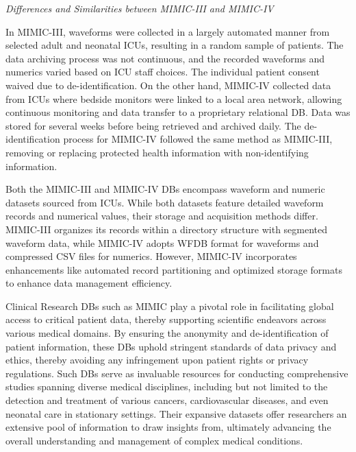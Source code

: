 \vspace{0.2cm}
\textit{Differences and Similarities between MIMIC-III and MIMIC-IV}
\vspace{0.2cm}

In MIMIC-III, waveforms were collected in a largely automated manner from selected adult and neonatal ICUs, resulting in a random sample of patients.
The data archiving process was not continuous, and the recorded waveforms and numerics varied based on ICU staff choices.
The individual patient consent waived due to de-identification.
On the other hand, MIMIC-IV collected data from ICUs where bedside monitors were linked to a local area network, allowing continuous monitoring and data transfer to a proprietary relational DB.
Data was stored for several weeks before being retrieved and archived daily.
The de-identification process for MIMIC-IV followed the same method as MIMIC-III, removing or replacing protected health information with non-identifying information.

Both the MIMIC-III and MIMIC-IV DBs encompass waveform and numeric datasets sourced from ICUs.
While both datasets feature detailed waveform records and numerical values, their storage and acquisition methods differ.
MIMIC-III organizes its records within a directory structure with segmented waveform data, while MIMIC-IV adopts WFDB format for waveforms and compressed CSV files for numerics.
However, MIMIC-IV incorporates enhancements like automated record partitioning and optimized storage formats to enhance data management efficiency.

\vspace{0.2cm}

Clinical Research DBs such as MIMIC play a pivotal role in facilitating global access to critical patient data, thereby supporting scientific endeavors across various medical domains.
By ensuring the anonymity and de-identification of patient information, these DBs uphold stringent standards of data privacy and ethics, thereby avoiding any infringement upon patient rights or privacy regulations.
Such DBs serve as invaluable resources for conducting comprehensive studies spanning diverse medical disciplines, including but not limited to the detection and treatment of various cancers, cardiovascular diseases, and even neonatal care in stationary settings.
Their expansive datasets offer researchers an extensive pool of information to draw insights from, ultimately advancing the overall understanding and management of complex medical conditions.

